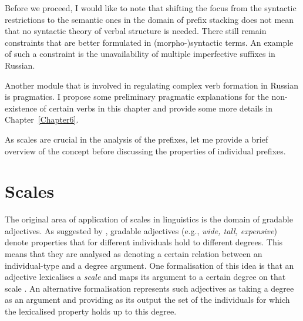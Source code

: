 
Before we proceed, I would like to note that shifting the focus from the syntactic restrictions to the semantic ones in the domain of prefix stacking does not mean that no syntactic theory of verbal structure is needed. There still remain constraints that are better formulated in (morpho-)syntactic terms. An example of such a constraint is the unavailability of multiple imperfective suffixes in Russian. 

Another module that is involved in regulating complex verb formation in Russian is pragmatics. I propose some preliminary pragmatic explanations for the non-existence of certain verbs in this chapter and provide some more details in Chapter~\ref{Chapter6}.

As scales are crucial in the analysis of the prefixes, let me provide a brief overview of the concept before discussing the properties of individual prefixes.

\section{Scales}


The original area of application of scales in linguistics is the domain of gradable adjectives. As suggested by \citet{Kennedy:99}, gradable adjectives (e.g., \textit{wide, tall, expensive}) denote properties that for different individuals hold to different degrees. This means that they are analysed as denoting a certain relation between an individual-type and a degree argument. One formalisation of this idea is that an adjective lexicalises a \textit{scale} and maps its argument to a certain degree on that scale \citep{Kennedy:01, KennedyLevin:02}. An alternative formalisation \citep[e.g.,][]{Heim:00} represents such adjectives as taking a degree as an argument and providing as its output the set of the individuals for which the lexicalised property holds up to this degree.

